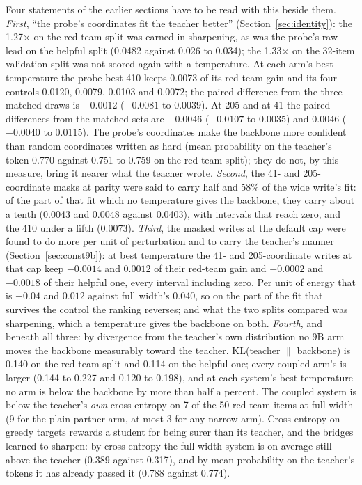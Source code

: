 \documentclass[11pt]{article}
\begin{document}
Four statements of the earlier sections have to be read with this beside them.
\emph{First}, ``the probe's coordinates fit the teacher better''
(Section~\ref{sec:identity}): the 1.27$\times$ on the red-team split was earned in
sharpening, as was the probe's raw lead on the helpful split (0.0482 against 0.026
to 0.034); the 1.33$\times$ on the 32-item validation split was not scored again
with a temperature. At
each arm's best temperature the probe-best 410 keeps 0.0073 of its red-team gain
and its four controls 0.0120, 0.0079, 0.0103 and 0.0072; the paired difference
from the three matched draws is $-0.0012$ ($-0.0081$ to $0.0039$). At 205 and at
41 the paired differences from the matched sets are $-0.0046$ ($-0.0107$ to
$0.0035$) and $0.0046$ ($-0.0040$ to $0.0115$). The probe's coordinates make the
backbone more confident than random coordinates written as hard (mean probability
on the teacher's token 0.770 against 0.751 to 0.759 on the red-team split); they do
not, by this measure, bring it nearer what the teacher wrote. \emph{Second}, the 41- and
205-coordinate masks at parity were said to carry half and 58\% of the wide
write's fit: of the part of that fit which no temperature gives the backbone, they
carry about a tenth (0.0043 and 0.0048 against 0.0403), with intervals that reach
zero, and the 410 under a fifth (0.0073). \emph{Third}, the masked writes at the
default cap were found to do more per unit of perturbation and to carry the
teacher's manner (Section~\ref{sec:const9b}): at best temperature the 41- and
205-coordinate writes at that cap keep $-0.0014$ and $0.0012$ of their red-team
gain and $-0.0002$ and $-0.0018$ of their helpful one, every interval including
zero. Per unit of energy that is $-0.04$ and $0.012$ against full width's 0.040, so
on the part of the fit that survives the control the ranking reverses; and what the
two splits compared was sharpening, which a temperature gives the backbone on both.
\emph{Fourth}, and beneath all three: by divergence from the teacher's own
distribution no 9B arm moves the backbone measurably toward the teacher. KL(teacher
$\|$ backbone) is 0.140 on the red-team split and 0.114 on the helpful one; every
coupled arm's is larger (0.144 to 0.227 and 0.120 to 0.198), and at each system's
best temperature no arm is below the backbone by more than half a percent. The
coupled system is below the teacher's \emph{own} cross-entropy on 7 of the 50
red-team items at full width (9 for the plain-partner arm, at most 3 for any narrow
arm). Cross-entropy on greedy targets rewards a student for being surer than its
teacher, and the bridges learned to sharpen: by cross-entropy the full-width system
is on average still above the teacher (0.389 against 0.317), and by mean probability
on the teacher's tokens it has already passed it (0.788 against 0.774).
\end{document}

